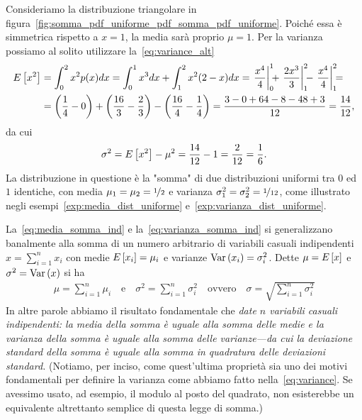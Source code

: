 \begin{examplebox}
  \begin{example}\label{exp:media_varianza_pdf_triangolare}
    Consideriamo la distribuzione triangolare in
    figura~\ref{fig:somma_pdf_uniforme_pdf_somma_pdf_uniforme}. Poiché essa
    è simmetrica rispetto a $x = 1$, la media sarà proprio $\mu = 1$.
    Per la varianza possiamo al solito utilizzare la~\eqref{eq:variance_alt}
    \begin{align*}
      \expect{x^2} & = \int_0^2 x^2 p(x) dx =
      \int_0^1 x^3 dx + \int_1^2 x^2(2 - x) dx =
      \eval{\frac{x^4}{4}}{0}{1} +
      \eval{\frac{2x^3}{3}}{1}{2} -
      \eval{\frac{x^4}{4}}{1}{2} =\\
      & = \left( \frac{1}{4} - 0 \right) +
      \left( \frac{16}{3} - \frac{2}{3} \right) -
      \left( \frac{16}{4} - \frac{1}{4} \right) =
      \frac{3 - 0 + 64 - 8 - 48 + 3}{12} = \frac{14}{12},
    \end{align*}
    da cui
    \begin{align*}
      \sigma^2 = \displaystyle E\left[x^2\right] - \mu^2 = \frac{14}{12} - 1 = \frac{2}{12} =
      \frac{1}{6}.
    \end{align*}
    La distribuzione in questione è la "somma" di due distribuzioni
    uniformi tra $0$ ed $1$ identiche, con media
    $\mu_1 = \mu_2 = \nicefrac{1}{2}$ e varianza
    $\sigma_1^2 = \sigma_2^2 = \nicefrac{1}{12}$, come illustrato negli
    esempi~\ref{exp:media_dist_uniforme} e~\ref{exp:varianza_dist_uniforme}.
  \end{example}
\end{examplebox}

La~\eqref{eq:media_somma_ind} e la~\eqref{eq:varianza_somma_ind} si
generalizzano banalmente alla somma di un numero arbitrario di variabili
casuali indipendenti $x = \sum_{i = 1}^{n} x_i$ con medie $\displaystyle E\left[x_i\right] = \mu_i$
e varianze $\text{Var}\left(x_i\right) = \sigma_i^2$. Dette $\mu = \displaystyle E\left[x\right]$ e
$\sigma^2 = \text{Var}\left(x\right)$ si ha
\begin{align}\label{eq:media_varianza_somma_ind}
  \mu = \sum_{i = 1}^{n} \mu_i \quad \text{e} \quad
  \sigma^2 = \sum_{i = 1}^{n} \sigma_i^2 \quad \text{ovvero} \quad
  \sigma  = \sqrt{\sum_{i = 1}^{n} \sigma_i^2}
\end{align}
In altre parole abbiamo il risultato fondamentale che
\emph{date $n$ variabili casuali indipendenti: la media della somma è uguale
  alla somma delle medie e la varianza della somma è uguale alla somma delle
  varianze---da cui la deviazione standard della somma è uguale alla somma
  in quadratura delle deviazioni standard.}
(Notiamo, per inciso, come quest'ultima proprietà sia uno dei motivi
fondamentali per definire la varianza come abbiamo fatto
nella~\eqref{eq:variance}. Se avessimo usato, ad esempio, il modulo al posto
del quadrato, non esisterebbe un equivalente altrettanto semplice di questa
legge di somma.)


